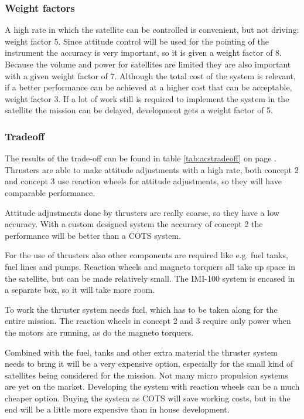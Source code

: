 \subsubsection{Weight factors}
A high rate in which the satellite can be controlled is convenient, but not driving: weight factor 5. Since attitude control will be used for the pointing of the instrument the accuracy is very important, so it is given a weight factor of 8. Because the volume and power for satellites are limited they are also important with a given weight factor of 7. Although the total cost of the system is relevant, if a better performance can be achieved at a higher cost that can be acceptable, weight factor 3. If a lot of work still is required to implement the system in the satellite the mission can be delayed, development gets a weight factor of 5.
\subsubsection{Tradeoff}
The results of the trade-off can be found in table \ref{tab:acstradeoff} on page \pageref{tab:acstradeoff}.
Thrusters are able to make attitude adjustments with a high rate, both concept 2 and concept 3 use reaction wheels for attitude adjustments, so they will have comparable performance.

Attitude adjustments done by thrusters are really coarse, so they have a low accuracy. With a custom designed system the accuracy of concept 2 the performance will be better than a \ac{COTS} system.

For the use of thrusters also other components are required like e.g. fuel tanks, fuel lines and pumps. Reaction wheels and magneto torquers all take up space in the satellite, but can be made relatively small. The IMI-100 system is encased in a separate box, so it will take more room.

To work the thruster system needs fuel, which has to be taken along for the entire mission. The reaction wheels in concept 2 and 3 require only power when the motors are running, as do the magneto torquers.

Combined with the fuel, tanks and other extra material the thruster system needs to bring it will be a very expensive option, especially for the small kind of satellites being considered for the mission. Not many micro propulsion systems are yet on the market. Developing the system with reaction wheels can be a much cheaper option. Buying the system as \ac{COTS} will save working costs, but in the end will be a little more expensive than in house development.

